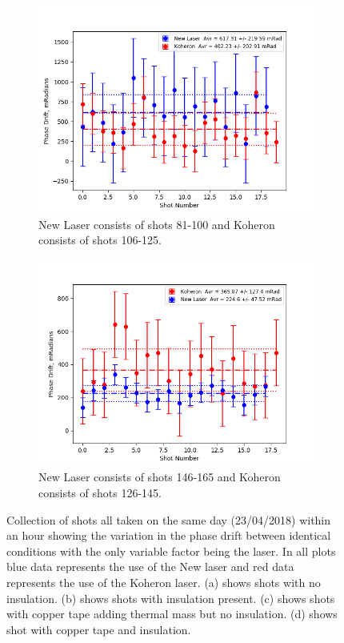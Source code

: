 \documentclass[12pt,a4paper,oneside]{report}
\begin{document}
\begin{figure}[H]
\begin{subfigure}{.5\textwidth}
\centering\captionsetup{width=.9\linewidth}
\includegraphics[width=\textwidth,angle=0]{DImages/Max_-_Min_Drift_for_Shots_5and_6.png}
\caption{New Laser consists of shots 81-100 and Koheron consists of shots 106-125.}
\end{subfigure}
\begin{subfigure}{.5\textwidth}
\centering\captionsetup{width=.9\linewidth}
\includegraphics[width=\textwidth, angle=0]{DImages/Max_-_Min_Drift_for_Shots_7and_8.png}
\caption{New Laser consists of shots 146-165 and Koheron consists of shots 126-145.}
\end{subfigure}
\caption{Collection of shots all taken on the same day (23/04/2018) within an hour showing the variation in the phase drift between identical conditions with the only variable factor being the laser. In all plots blue data represents the use of the New laser and red data represents the use of the Koheron laser. (a) shows shots with no insulation. (b) shows shots with insulation present. (c) shows shots with copper tape adding thermal mass but no insulation. (d) shows shot with copper tape and insulation.}
\label{fig:4-max-min-drifts}
\end{figure}
\end{document}
